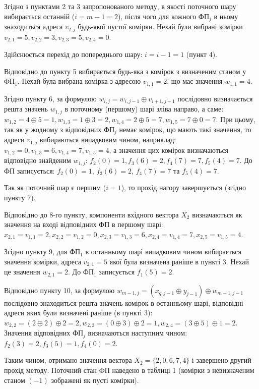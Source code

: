 \documentclass[12pt]{article}
\begin{document}
Згідно з пунктами 2 та 3 запропонованого методу, в якості поточного шару вибирається останній ($i = m - 1 = 2$), після чого для кожного ФП$_j$ в ньому знаходиться адреса $v_{2, j}$ будь-якої пустої комірки. Нехай були вибрані комірки $v_{2,1}=5, v_{2,2}=3, v_{2,3}=5, v_{2,4}=0$.

Здійснюється перехід до попереднього шару: $i = i - 1 = 1$ (пункт 4).

Відповідно до пункту 5 вибирається будь-яка з комірок з визначеним станом у ФП$_1$.
Нехай була вибрана комірка з адресою $v_{1,1}=2$, що має значення $w_{1,1}=4$.

Згідно пункту 6, за формулою $w_{i,j} = w_{i,j-1} \oplus v_{i+1,j-1}$ послідовно визначається решта значень $w_{1,j}$ в поточному (першому) шарі зліва направо, а саме: $w_{1,2} = 4 \oplus 5 = 1, w_{1,3} = 1 \oplus 3 = 2, w_{1,4} = 2 \oplus 5 = 7, w_{1,5} = 7 \oplus 0 = 7$.
При цьому, так як у жодному з відповідних ФП$_j$ немає комірок, що мають такі значення, то адреси $v_{1,j}$ вибираються випадковим чином, наприклад: $v_{1,2} = 0, v_{1,3} = 6, v_{1,4} = 7, v_{1,5} = 4$, а значення цих комірок визначаються відповідно знайденим $w_{1,j}$: $f_2(0)=1, f_3(6)=2, f_4(7)=7, f_5(4)=7$. До ФП записується: $f_2(0)=1$, $f_3(6)=2$, $f_4(7)=7$ та $f_5(4)=7$.

Так як поточний шар є першим ($i=1$), то прохід нагору завершується (згідно пункту 7).

Відповідно до 8-го пункту, компоненти вхідного вектора $X_2$ визначаються як значення на вході відповідних ФП в першому шарі: $x_{2,1}=v_{1,1}=2, x_{2,2}=v_{1,2}=0, x_{2,3}=v_{1,3}=6, x_{2,4}=v_{1,4}=7, x_{2,5}=v_{1,5}=4$.

Згідно пункту 9, для ФП$_1$ в останньому шарі випадковим чином вибирається значення комірки, адреса $v_{2,1}=5$ якої  була визначена раніше в пункті 3. Нехай це значення $w_{2,1}=2$. До ФП$_1$ записується $f_1(5)=2$.

Відповідно пункту 10, за формулою $w_{m-1,j}=(x_{q,j-1} \oplus y_{j-1}) \oplus w_{m-1,j-1}$ послідовно знаходиться решта значень комірок в останньому шарі, відповідні адреси яких були визначені раніше (в пункті 3): $w_{2,2} = (2 \oplus 2) \oplus 2 = 2, w_{2,3} = (0 \oplus 3) \oplus 2 = 1, w_{2,4} = (3 \oplus 5) \oplus 1 = 2$. Значення відповідних ФП$_j$ визначаються наступним чином: $f_2(3)=2, f_3(5)=1, f_4(0)=2$.

Таким чином, отримано значення вектора $X_2=\{2,0,6,7,4\}$ і завершено другий прохід методу. Поточний стан ФП наведено в таблиці 1 (комірки з невизначеним станом $(-1)$ зображені як пусті комірки). %
\end{document}
